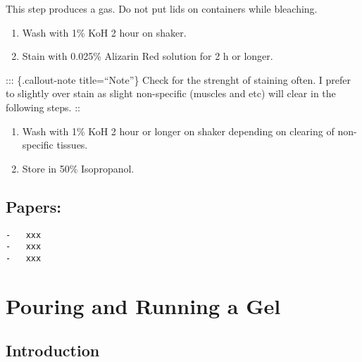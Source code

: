 \documentclass[
  letterpaper,
  DIV=11,
  numbers=noendperiod]{scrreprt}
\begin{document}
\begin{tcolorbox}[enhanced jigsaw, toprule=.15mm, breakable, coltitle=black, leftrule=.75mm, title=\textcolor{quarto-callout-note-color}{\faInfo}\hspace{0.5em}{Warning}, bottomrule=.15mm, toptitle=1mm, bottomtitle=1mm, colframe=quarto-callout-note-color-frame, opacityback=0, colback=white, opacitybacktitle=0.6, colbacktitle=quarto-callout-note-color!10!white, rightrule=.15mm, titlerule=0mm, arc=.35mm, left=2mm]

This step produces a gas. Do not put lids on containers while bleaching.

\end{tcolorbox}

\begin{enumerate}
\def\labelenumi{\arabic{enumi}.}
\setcounter{enumi}{3}
\item
  Wash with 1\% KoH 2 hour on shaker.
\item
  Stain with 0.025\% Alizarin Red solution for 2 h or longer.
\end{enumerate}

::: \{.callout-note title=``Note''\} Check for the strenght of staining
often. I prefer to slightly over stain as slight non-specific (muscles
and etc) will clear in the following steps. ::

\begin{enumerate}
\def\labelenumi{\arabic{enumi}.}
\setcounter{enumi}{5}
\item
  Wash with 1\% KoH 2 hour or longer on shaker depending on clearing of
  non-specific tissues.
\item
  Store in 50\% Isopropanol.
\end{enumerate}

\hypertarget{papers}{%
\section{Papers:}\label{papers}}

\begin{verbatim}
-   xxx
-   xxx
-   xxx
\end{verbatim}

\hypertarget{sec-molecular-gel}{%
\chapter{Pouring and Running a Gel}\label{sec-molecular-gel}}

\hypertarget{introduction-16}{%
\section{Introduction}\label{introduction-16}}
\end{document}

